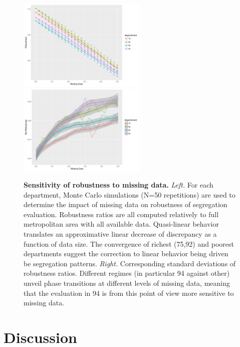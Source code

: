 \documentclass[runningheads,a4paper]{llncs2e/llncs}
\begin{document}
\begin{figure}
\centering
\hspace{-2cm}\includegraphics[width=0.55\textwidth]{figures/alldeps_rob}
\includegraphics[width=0.55\textwidth]{figures/alldeps_sdrob}
\caption{\textbf{Sensitivity of robustness to missing data.} \textit{Left.} For each department, Monte Carlo simulations (N=50 repetitions) are used to determine the impact of missing data on robustness of segregation evaluation. Robustness ratios are all computed relatively to full metropolitan area with all available data. Quasi-linear behavior translates an approximative linear decrease of discrepancy as a function of data size. The convergence of richest (75,92) and poorest departments suggest the correction to linear behavior being driven be segregation patterns. \textit{Right.} Corresponding standard deviations of robustness ratios. Different regimes (in particular 94 against other) unveil phase transitions at different levels of missing data, meaning that the evaluation in 94 is from this point of view more sensitive to missing data.}
\end{figure}





\section{Discussion}
\end{document}
